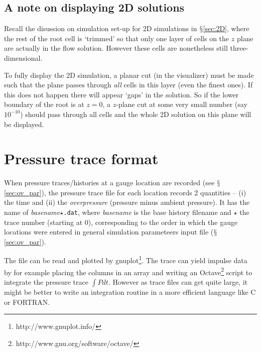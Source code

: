 \documentclass[pdftex, 12pt, a4paper]{report}
\begin{document}
\subsection{A note on displaying 2D solutions}\label{sec:2Dviz}

Recall the disussion on simulation set-up for 2D simulations in $\mathsection$\ref{sec:2D}, where the rest of the root cell
is `trimmed' so that only one layer of cells on the $z$ plane are actually in the flow solution.  However these cells are
nonetheless still three-dimensional.

To fully display the 2D simulation, a planar cut (in the visualizer) must be made such that the plane passes through \emph{all}
cells in this layer (even the finest ones).  If this does not happen there will appear `gaps' in the solution.
So if the lower boundary of the root is at $z = 0$, a $z$-plane cut
at some very small number (say $10^{-10}$) should pass through all cells and the whole 2D solution on this plane will be displayed.

\section{Pressure trace format}\label{sec:p_trace_file}

When pressure traces/histories at a gauge location are recorded (see $\mathsection$\ref{sec:ov_par}), the pressure trace file
for each location records 2 quantities -- (i) the time and (ii) the \emph{overpressure} (pressure minus ambient pressure).  It has 
the name of \emph{basename}$\star$\verb'.dat', where \emph{basename} is the base history filename and $\star$ the trace 
number (starting at 0), corresponding to the order in which the gauge
locations were entered in general simulation parameteers input file ($\mathsection$\ref{sec:ov_par}).  

The file can be read and plotted by gnuplot\footnote{http://www.gnuplot.info/}.  
The trace can yield impulse data by for example placing the columns in an array and writing an  
Octave\footnote{http://www.gnu.org/software/octave/} script to integrate the pressure trace $\int Pdt$.  However as trace files
can get quite large, it might be better to write an integration routine in a more efficient language like C or FORTRAN.

\end{document}
